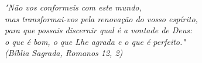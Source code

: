 \begin{epigrafe}
    \vspace*{\fill}
	\begin{flushright}

		\textit{"Não vos conformeis com este mundo,\\
		 mas transformai-vos pela renovação do vosso espírito,\\
		 para que possais discernir qual é a vontade de Deus:\\
		 o que é bom, o que Lhe agrada e o que é perfeito." \\
		(Bíblia Sagrada, Romanos 12, 2)}
	\end{flushright}
\end{epigrafe}
